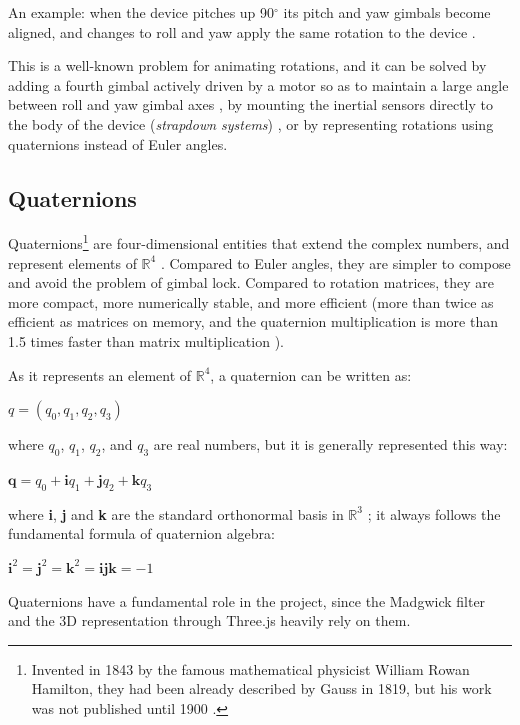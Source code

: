 An example: when the device pitches up 90$^{\circ}$ its pitch and yaw gimbals become aligned, and changes to roll and yaw apply the same rotation to the device \cite[68]{Tit04}.

This is a well-known problem for animating rotations, and it can be solved by adding a fourth gimbal actively driven by a motor so as to maintain a large angle between roll and yaw gimbal axes \cite{Bie99}, by mounting the inertial sensors directly to the body of the device (\textit{strapdown systems}) \cite[3]{Tit04}, or by representing rotations using quaternions instead of Euler angles.

\subsection{Quaternions}
Quaternions\footnote{Invented in 1843 by the famous mathematical physicist William Rowan Hamilton, they had been already described by Gauss in 1819, but his work was not published until 1900 \cite{Puj12}.} are four-dimensional entities that extend the complex numbers, and represent elements of $\mathbb{R}^4$ \cite{Ham47}. Compared to Euler angles, they are simpler to compose and avoid the problem of gimbal lock. Compared to rotation matrices, they are more compact, more numerically stable, and more efficient (more than twice as efficient as matrices on memory, and the quaternion multiplication is more than 1.5 times faster than matrix multiplication \cite{Gol10}).

As it represents an element of $\mathbb{R}^4$, a quaternion can be written as:

\begin{center}
	$q = (q_0, q_1, q_2, q_3)$
\end{center}
where $q_0$, $q_1$, $q_2$, and $q_3$ are real numbers, but it is generally represented this way:

\begin{center}
	$\textbf{q} = q_0 + \textbf{i}q_1 + \textbf{j}q_2 + \textbf{k}q_3$
\end{center}
where \textbf{i}, \textbf{j} and \textbf{k} are the standard orthonormal basis in $\mathbb{R}^3$ \cite{Kui99}; it always follows the fundamental formula of quaternion algebra:

\begin{center}
	$\textbf{i}^2 = \textbf{j}^2 = \textbf{k}^2 = \textbf{ijk} = -1$
\end{center}
Quaternions have a fundamental role in the project, since the Madgwick filter \cite{Mad10} and the 3D representation through Three.js heavily rely on them.

